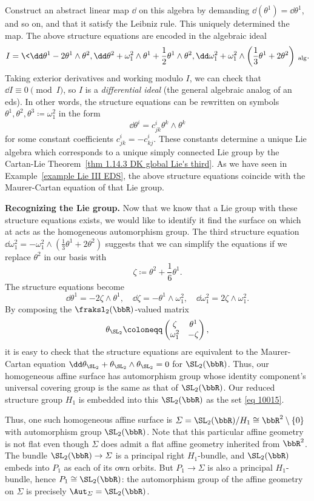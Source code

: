 Construct an abstract linear map $\dd$ on this algebra by demanding $\dd(\theta^1)=\dd\theta^1$, and so on, and that it satisfy the Leibniz rule. This uniquely determined the map. The above structure equations are encoded in the algebraic ideal 
\[I=\<\dd\theta^1-2\theta^1\wedge\theta^2, 
\dd\theta^2+\omega^2_1\wedge\theta^1+\frac12\theta^1\wedge\theta^2,
\dd\omega^2_1+\omega^2_1\wedge\left(\frac13\theta^1+2\theta^2\right)\>_{\mathrm{alg}}.
\]
Taking exterior derivatives and working modulo $I$, we can check that $\dd I\equiv 0\pmod{I}$, so $I$ is a \emph{differential ideal} (the general algebraic analog of an \gls{eds}). In other words, the structure equations can be rewritten on symbols $\theta^1,\theta^2,\theta^3\coloneqq \omega^2_1$ in the form 
\[\dd\theta^i=c^i_{jk}\theta^k\wedge\theta^k\]
for some constant coefficients $c^i_{jk}=-c^i_{kj}$. These constants determine a unique Lie algebra which corresponds to a unique simply connected Lie group by the Cartan-Lie Theorem~\ref{thm 1.14.3 DK global Lie's third}. As we have seen in Example~\ref{example Lie III EDS}, the above structure equations coincide with the Maurer-Cartan equation of that Lie group. 

\textbf{Recognizing the Lie group.} Now that we know that a Lie group with these structure equations exists, we would like to identify it find the surface on which at acts as the homogeneous automorphism group. The third structure equation $\dd\omega^2_1=-\omega^2_1\wedge\left(\frac13\theta^1+2\theta^2\right)$ suggests that we can simplify the equations if we replace $\theta^2$ in our basis with
\[\zeta\coloneqq \theta^2+\frac16\theta^1.\]
The structure equations become 
\[\dd\theta^1=-2\zeta\wedge \theta^1,\quad \dd\zeta=-\theta^1\wedge\omega^2_1,\quad \dd\omega^2_1=2\zeta\wedge\omega^2_1.\]
By composing the $\fraksl_2(\bbR)$-valued matrix 
\[\theta_{\SL_2}\coloneqq \begin{pmatrix}
    \zeta & \theta^1\\
    \omega^2_1 & -\zeta
\end{pmatrix},\]
it is easy to check that the structure equations are equivalent to the Maurer-Cartan equation $\dd\theta_{\SL_2}+\theta_{\SL_2}\wedge \theta_{\SL_2}=0$ for $\SL_2(\bbR)$. Thus, our homogeneous affine surface has automorphism group whose identity component's universal covering group is the same as that of $\SL_2(\bbR)$. Our reduced structure group $H_1$ is embedded into this $\SL_2(\bbR)$ as the set \eqref{eq 10015}. 

Thus, one such homogeneous affine surface is $\varSigma=\SL_2(\bbR)\slash H_1\cong \bbR^2\setminus\{0\}$ with automorphism group $\SL_2(\bbR)$. Note that this particular affine geometry is not flat even though $\varSigma$ does admit a flat affine geometry inherited from $\bbR^2$. The bundle $\SL_2(\bbR)\to \varSigma$ is a principal right $H_1$-bundle, and $\SL_2(\bbR)$ embeds into $P_1$ as each of its own orbits. But $P_1\to \varSigma$ is also a principal $H_1$-bundle, hence $P_1\cong \SL_2(\bbR)$: the automorphism group of the affine geometry on $\varSigma$ is precisely $\Aut_\varSigma=\SL_2(\bbR)$.

